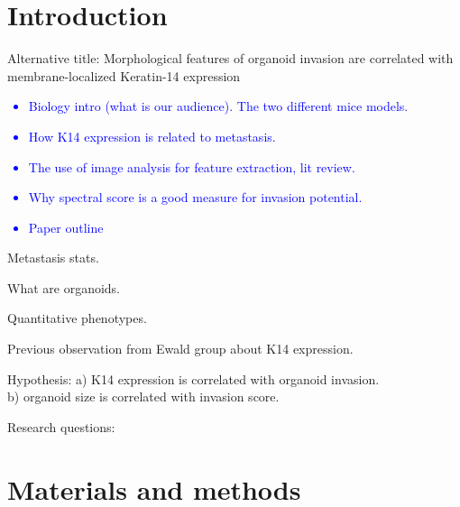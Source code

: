 \documentclass[10pt,letterpaper]{article}
\begin{document}
\section*{Introduction}

Alternative title: Morphological features of organoid invasion are correlated with membrane-localized Keratin-14 expression

\textcolor{blue}{
\begin{itemize}
    \item Biology intro (what is our audience). The two different mice models.
    \item How K14 expression is related to metastasis.
    \item The use of image analysis for feature extraction, lit review.
    \item Why spectral score is a good measure for invasion potential.
    \item Paper outline
\end{itemize}
}

Metastasis stats.

What are organoids.

Quantitative phenotypes.

Previous observation from Ewald group about K14 expression.

Hypothesis: a) K14 expression is correlated with organoid invasion.\\
b) organoid size is correlated with invasion score.

Research questions:


\section*{Materials and methods}
\end{document}
